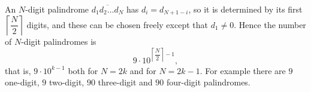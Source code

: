An $N$-digit palindrome $\overline{d_1d_2\dots d_N}$ has $d_i=d_{N+1-i}$, so it is determined by its first $\left\lceil\dfrac N2\right\rceil$ digits, and these can be chosen freely except that $d_1\ne0$. Hence the number of $N$-digit palindromes is
\[\boxed{9\cdot10^{\left\lceil\dfrac N2\right\rceil-1}},\]
that is, $9\cdot10^{k-1}$ both for $N=2k$ and for $N=2k-1$. For example there are $9$ one-digit, $9$ two-digit, $90$ three-digit and $90$ four-digit palindromes.
